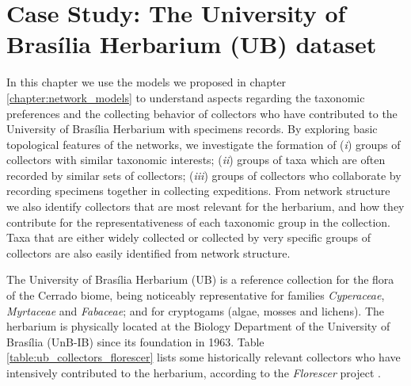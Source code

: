 \chapter{Case Study: The University of Brasília Herbarium (UB) dataset}\label{casestudy_ub}


In this chapter we use the models we proposed in chapter \ref{chapter:network_models} to understand aspects regarding the taxonomic preferences and the collecting behavior of collectors who have contributed to the University of Brasília Herbarium with specimens records.
By exploring basic topological features of the networks, we investigate the formation of
(\textit{i}) groups of collectors with similar taxonomic interests;
(\textit{ii}) groups of taxa which are often recorded by similar sets of collectors;
(\textit{iii}) groups of collectors who collaborate by recording specimens together in collecting expeditions. 
From network structure we also identify collectors that are most relevant for the herbarium, and how they contribute for the representativeness of each taxonomic group in the collection.
Taxa that are either widely collected or collected by very specific groups of collectors are also easily identified from network structure.

The University of Brasília Herbarium (UB) is a reference collection for the flora of the Cerrado biome, being noticeably representative for families \textit{Cyperaceae}, \textit{Myrtaceae} and \textit{Fabaceae}; and for cryptogams (algae, mosses and lichens).
%
The herbarium is physically located at the Biology Department of the University of Brasília (UnB-IB) since its foundation in 1963.
Table \ref{table:ub_collectors_florescer} lists some historically relevant collectors who have intensively contributed to the herbarium, according to the \textit{Florescer} project \cite{florescer}. 

